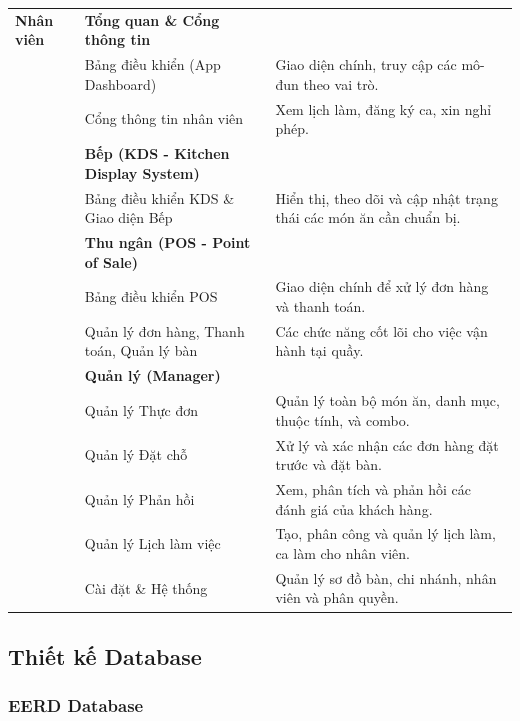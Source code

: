 \begin{longtable}{
    >{\raggedright\arraybackslash}p{2.5cm} %
    >{\raggedright\arraybackslash}p{4.5cm} %
    p{8cm}  %
}
\textbf{Nhân viên}
    & \textbf{Tổng quan \& Cổng thông tin}
    & \\
    & Bảng điều khiển (App Dashboard)
    & Giao diện chính, truy cập các mô-đun theo vai trò. \\
    & Cổng thông tin nhân viên
    & Xem lịch làm, đăng ký ca, xin nghỉ phép. \\
\cmidrule(lr){2-3}
    & \textbf{Bếp (KDS - Kitchen Display System)}
    & \\
    & Bảng điều khiển KDS \& Giao diện Bếp
    & Hiển thị, theo dõi và cập nhật trạng thái các món ăn cần chuẩn bị. \\
\cmidrule(lr){2-3}
    & \textbf{Thu ngân (POS - Point of Sale)}
    & \\
    & Bảng điều khiển POS
    & Giao diện chính để xử lý đơn hàng và thanh toán. \\
    & Quản lý đơn hàng, Thanh toán, Quản lý bàn
    & Các chức năng cốt lõi cho việc vận hành tại quầy. \\
\cmidrule(lr){2-3}
    & \textbf{Quản lý (Manager)}
    & \\
    & Quản lý Thực đơn
    & Quản lý toàn bộ món ăn, danh mục, thuộc tính, và combo. \\
    & Quản lý Đặt chỗ
    & Xử lý và xác nhận các đơn hàng đặt trước và đặt bàn. \\
    & Quản lý Phản hồi
    & Xem, phân tích và phản hồi các đánh giá của khách hàng. \\
    & Quản lý Lịch làm việc
    & Tạo, phân công và quản lý lịch làm, ca làm cho nhân viên. \\
    & Cài đặt \& Hệ thống
    & Quản lý sơ đồ bàn, chi nhánh, nhân viên và phân quyền. \\

\end{longtable}

\subsection{Thiết kế Database}
\subsubsection{EERD Database}

